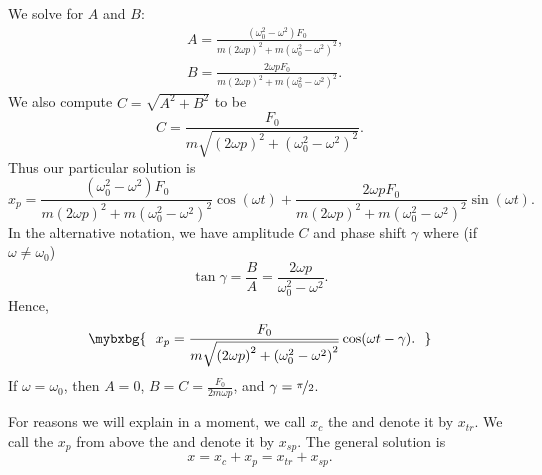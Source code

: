 We solve for $A$ and $B$:
\begin{equation*}
\begin{aligned}
& A=\frac{(\omega_0^2-\omega^2) F_0}
{m{(2\omega p)}^2+m{(\omega_0^2-\omega^2)}^2} , \\
& B=\frac{2 \omega p F_0}
{m{(2\omega p)}^2+m{(\omega_0^2-\omega^2)}^2} .
\end{aligned}
\end{equation*}
We also compute $C = \sqrt{A^2+B^2}$
to be
\begin{equation*}
C = \frac{F_0}{m \sqrt{{(2\omega p)}^2+{(\omega_0^2-\omega^2)}^2}} .
\end{equation*}
Thus our particular solution is
\begin{equation*}
x_p = 
\frac{(\omega_0^2-\omega^2) F_0}
{m{(2\omega p)}^2+m{(\omega_0^2-\omega^2)}^2} \cos (\omega t) +
\frac{2 \omega p F_0}
{m{(2\omega p)}^2+m{(\omega_0^2-\omega^2)}^2} \sin (\omega t) .
\end{equation*}
In the alternative notation, we have amplitude $C$ and phase shift $\gamma$
where (if $\omega \not= \omega_0$)
\begin{equation*}
\tan \gamma = \frac{B}{A} = \frac{2\omega p}{\omega_0^2-\omega^2} .
\end{equation*}
Hence,
\begin{equation*}
\mybxbg{~~
x_p = 
\frac{F_0}{m \sqrt{{(2\omega p)}^2+{(\omega_0^2-\omega^2)}^2}} 
\cos ( \omega t - \gamma ) .
~~}
\end{equation*}
If $\omega = \omega_0$, then $A=0$, $B = C = \frac{F_0}{2m\omega p}$,
and $\gamma = \nicefrac{\pi}{2}$.



\medskip

For reasons we will explain in a moment, we call $x_c$ the
\emph{}
and denote it by $x_{tr}$.  We call the
$x_p$ from above the \emph{} and denote it
by $x_{sp}$.
The general solution is
\begin{equation*}
x = x_c + x_p = x_{tr} + x_{sp} .
\end{equation*}

